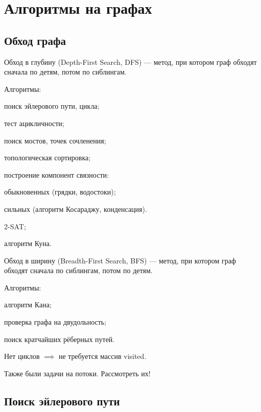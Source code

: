 \section{Алгоритмы на графах}

\subsection{Обход графа}

{\bold Обход в глубину} {\ital (Depth-First Search, DFS)} --- метод, при котором граф обходят сначала по детям, потом по сиблингам.
\begin{theorem}
{\bold Алгоритмы:}
\begin{list*}
\item поиск эйлерового пути, цикла;
\item тест ацикличности;
\item поиск мостов, точек сочленения;
\item топологическая сортировка;
\item построение компонент связности:
\begin{list*}[2]
\item обыкновенных {\ital\color{desc} (грядки, водостоки)};
\item сильных {\ital\color{desc} (алгоритм Косараджу, конденсация)}.
\end{list*}
\item 2-SAT;
\item алгоритм Куна.
\end{list*}
\end{theorem}
{\bold Обход в ширину} {\ital (Breadth-First Search, BFS)} --- метод, при котором граф обходят сначала по сиблингам, потом по детям.
\begin{theorem}
{\bold Алгоритмы:}
\begin{list*}
\item алгоритм Кана;
\item проверка графа на двудольность;
\item поиск кратчайших рёберных путей.
\end{list*}
\end{theorem}

Нет циклов $\implies$ не требуется массив {\ital visited}.

Также были задачи на потоки. Рассмотреть их!

\subsection{Поиск эйлерового пути}

